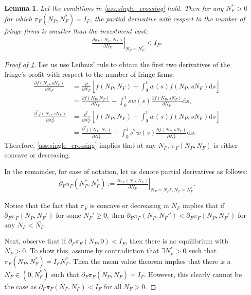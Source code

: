 \documentclass[a4paper]{article}
\newtheorem{lemma}{Lemma}
\newcommand{\ds}{\mathrm{d}s}
\begin{document}
\begin{lemma}
    \label{lem:slope_at_eq}
    Let the conditions in \cref{ass:single_crossing} hold. Then for any $N_F^* > 0$ for which $\pi_F(N_P, N_F^*) = I_F$, the partial derivative with respect to the number of fringe firms is smaller than the investment cost:
    \begin{align*}
        \left. \frac{\partial \pi_F(N_P, N_F)}{\partial N_F} \right|_{N_F = N_F^*} < I_F.
    \end{align*}
\end{lemma}
\begin{proof}[Proof of \cref{lem:slope_at_eq}]
    Let us use Leibniz' rule to obtain the first two derivatives of the fringe's profit with respect to the number of fringe firms:
    \begin{align*}
        \frac{\partial f(N_P, sN_F)}{\partial N_F} &= \frac{\partial}{\partial N_F} \left[ f(N_P, N_F) - \int_0^1 w(s) f(N_P, sN_F) \ds \right] \\
        &= \frac{\partial f(N_P, N_F)}{\partial N_F} - \int_0^1 s w(s) \frac{\partial f(N_P, sN_F)}{\partial N_F} \ds, \\
        \frac{\partial^2 f(N_P, sN_F)}{\partial N_F^2} &= \frac{\partial^2}{\partial N_F^2} \left[ f(N_P, N_F) - \int_0^1 w(s) f(N_P, sN_F) \ds \right] \\
        &= \frac{\partial^2 f(N_P, N_F)}{\partial N_F^2} - \int_0^1 s^2 w(s) \frac{\partial f(N_P, sN_F)}{\partial N_F^2} \ds.
    \end{align*}
    Therefore, \cref{ass:single_crossing} implies that at any $N_F$, $\pi_F(N_P, N_F)$ is either concave or decreasing.

    In the remainder, for ease of notation, let us denote partial derivatives as follows:
    \begin{align*}
        \partial_F \pi_F(N_P^*, N_F^*) := \left. \frac{\partial \pi_F(N_P, N_F)}{\partial N_F} \right|_{N_P = N_P*, N_F = N_F^*}.
    \end{align*}

    Notice that the fact that $\pi_F$ is concave or decreasing in $N_F$ implies that if $\partial_F \pi_F(N_P, N_F')$ for some $N_F' \geq 0$, then $\partial_F \pi_F(N_P, N_F'') < \partial_F \pi_F(N_P, N_F')$ for any $\tilde{N_F} < \bar{N_F}$.

    Next, observe that if $\partial_F \pi_F(N_P, 0) < I_F$, then there is no equilibrium with $N_F > 0$.
    To show this, assume by contradiction that $\exists N_F^* > 0$ such that $\pi_F(N_P, N_F^*) = I_F N_F^*$.
    Then the mean value theorem implies that there is a $\bar{N}_F \in (0, N_F^*)$ such that $\partial_F \pi_F(N_P, \bar{N}_F) = I_F$.
    However, this clearly cannot be the case as $\partial_F \pi_F(N_P, N_F) < I_F$ for all $N_F > 0$.


\end{proof}
\end{document}
